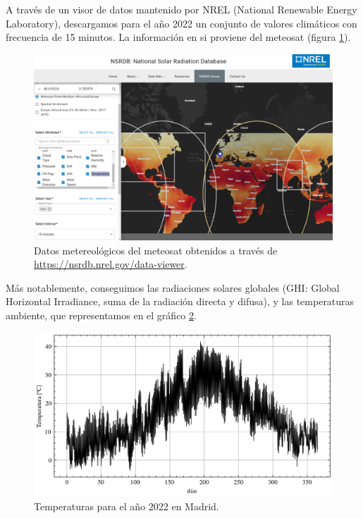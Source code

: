 A través de un visor de datos mantenido por NREL (National Renewable Energy
Laboratory), descargamos para el año 2022 un conjunto de valores climáticos con
frecuencia de 15 minutos. La información en si proviene del meteosat (figura
\ref{fig:meteosat_nsrdb}).

\begin{figure}[h] \centering
	\centering
	\includegraphics[width=1\textwidth]{./capitulos/adquisicion_de_datos/images/meteosat_nsrdb.png}
  \caption{Datos metereológicos del meteosat obtenidos a través de
  \url{https://nsrdb.nrel.gov/data-viewer}.}
	\label{fig:meteosat_nsrdb}
\end{figure}

Más notablemente, conseguimos las radiaciones solares globales (GHI: Global
Horizontal Irradiance, suma de la radiación directa y difusa), y las
temperaturas ambiente, que representamos en el gráfico
\ref{fig:temperatures_year}.

\begin{figure}[h] \centering
	\centering
	\includegraphics[width=1\textwidth]{./capitulos/adquisicion_de_datos/images/temperatures_year.png}
  \caption{Temperaturas para el año 2022 en Madrid.}
	\label{fig:temperatures_year}
\end{figure}
